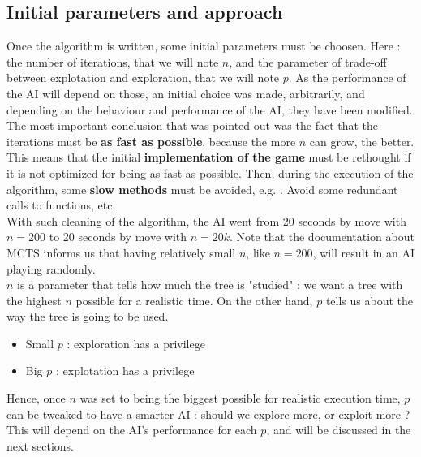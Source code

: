\subsection{Initial parameters and approach \label{sec:param_approach}}
Once the algorithm is written, some initial parameters must be choosen. Here : the number of iterations, that we will note $n$, and the parameter of trade-off between explotation and exploration, that we will note $p$. As the performance of the AI will depend on those, an initial choice was made, arbitrarily, and depending on the behaviour and performance of the AI, they have been modified. \\

The most important conclusion that was pointed out was the fact that the iterations must be \textbf{as fast as possible}, because the more $n$ can grow, the better. This means that the initial \textbf{implementation of the game} must be rethought if it is not optimized for being as fast as possible. Then, during the execution of the algorithm, some \textbf{slow methods} must be avoided, e.g. . Avoid some redundant calls to functions, etc. \\

With such cleaning of the algorithm, the AI went from 20 seconds by move with $n=200$ to 20 seconds by move with $n=20k$. Note that the documentation about MCTS informs us that having relatively small $n$, like $n=200$, will result in an AI playing randomly. \\

$n$ is a parameter that tells how much the tree is "studied" : we want a tree with the highest $n$ possible for a realistic time. On the other hand, $p$ tells us about the way the tree is going to be used. 
\begin{itemize}
    \item Small $p$ : exploration has a privilege 
    \item Big $p$ : explotation has a privilege 
\end{itemize}

Hence, once $n$ was set to being the biggest possible for realistic execution time, $p$ can be tweaked to have a smarter AI : should we explore more, or exploit more ? This will depend on the AI's performance for each $p$, and will be discussed in the next sections.

